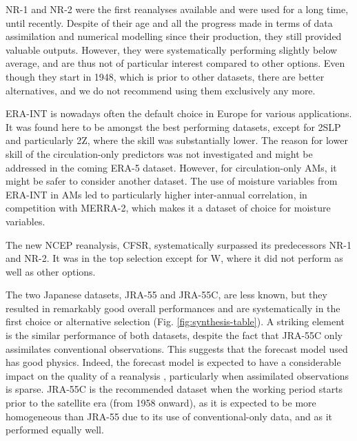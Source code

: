 \documentclass{ametsoc}
\begin{document}
NR-1 and NR-2 were the first reanalyses available and were used for a long time, until recently. Despite of their age and all the progress made in terms of data assimilation and numerical modelling since their production, they still provided valuable outputs. However, they were systematically performing slightly below average, and are thus not of particular interest compared to other options. Even though they start in 1948, which is prior to other datasets, there are better alternatives, and we do not recommend using them exclusively any more.

ERA-INT is nowadays often the default choice in Europe for various applications. It was found here to be amongst the best performing datasets, except for 2SLP and particularly 2Z, where the skill was substantially lower. The reason for lower skill of the circulation-only predictors was not investigated and might be addressed in the coming ERA-5 dataset. However, for circulation-only AMs, it might be safer to consider another dataset. The use of moisture variables from ERA-INT in AMs led to particularly higher inter-annual correlation, in competition with MERRA-2, which makes it a dataset of choice for moisture variables.

The new NCEP reanalysis, CFSR, systematically surpassed its predecessors NR-1 and NR-2. It was in the top selection except for W, where it did not perform as well as other options.

The two Japanese datasets, JRA-55 and JRA-55C, are less known, but they resulted in remarkably good overall performances and are systematically in the first choice or alternative selection (Fig. \ref{fig:synthesis-table}). A striking element is the similar performance of both datasets, despite the fact that JRA-55C only assimilates conventional observations. This suggests that the forecast model used has good physics. Indeed, the forecast model is expected to have a considerable impact on the quality of a reanalysis \citep{Kobayashi2015}, particularly when assimilated observations is sparse. JRA-55C is the recommended dataset when the working period starts prior to the satellite era (from 1958 onward), as it is expected to be more homogeneous than JRA-55 due to its use of conventional-only data, and as it performed equally well.
\end{document}
